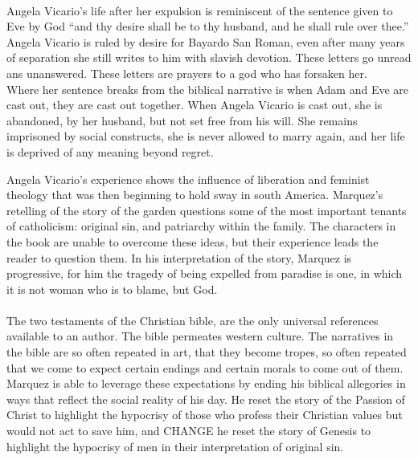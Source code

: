 \documentclass[11pt,a4wide]{article}
\begin{document}
\paragraph{} Angela Vicario's life after her expulsion is reminiscent of the 
sentence given to Eve by God ``and thy desire shall be to thy husband, and he 
shall rule over thee.\cite[Genesis 3:16]{bible}'' Angela Vicario is ruled by 
desire for Bayardo San Roman, even after many years of separation she still 
writes to him with slavish devotion. These letters go unread ans unanswered. 
These letters are prayers to a god who has forsaken her.\\
Where her sentence breaks from the biblical narrative is when Adam and Eve
are cast out, they are cast out together. When Angela Vicario is cast out, she 
is abandoned, by her husband, but not set free from his will. She remains 
imprisoned by social constructs, she is never allowed to marry again, and
her life is deprived of any meaning beyond regret. 

Angela Vicario's experience shows the influence of liberation and feminist 
theology that was then beginning to hold sway in south America.\cite{lib-theo} 
Marquez's retelling of the story of the garden questions some of the most 
important tenants of catholicism: original sin, and patriarchy within the 
family. The characters in the book are unable to overcome these ideas, but their 
experience leads the reader to question them. In his interpretation of the 
story, Marquez is progressive, for him the tragedy of being expelled from 
paradise is one, in which it is not
woman who is to blame, but God.

\paragraph{} The two testaments of the Christian bible, are the only universal 
references available to an author. The bible permeates
western culture. The narratives in the bible are so often repeated in art, that 
they become tropes, so often repeated that we come to expect certain endings and 
certain morals to come out of them.  Marquez is able to leverage these 
expectations by ending his biblical allegories in ways that reflect the social 
reality of his day. He reset the story of the Passion of Christ to highlight the 
hypocrisy of those who profess their Christian values but would not act to save 
him, and CHANGE
he reset the story of Genesis to highlight the hypocrisy of men in their 
interpretation of original sin.
\end{document}
